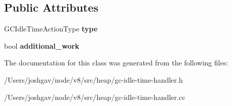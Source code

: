 \subsection*{Public Attributes}
\begin{DoxyCompactItemize}
\item 
G\+C\+Idle\+Time\+Action\+Type {\bfseries type}\hypertarget{classv8_1_1internal_1_1_g_c_idle_time_action_a212425aefe31dba1f8e914a21bc2f94f}{}\label{classv8_1_1internal_1_1_g_c_idle_time_action_a212425aefe31dba1f8e914a21bc2f94f}

\item 
bool {\bfseries additional\+\_\+work}\hypertarget{classv8_1_1internal_1_1_g_c_idle_time_action_aad4d2facf246f97d143f85fe0d371571}{}\label{classv8_1_1internal_1_1_g_c_idle_time_action_aad4d2facf246f97d143f85fe0d371571}

\end{DoxyCompactItemize}


The documentation for this class was generated from the following files\+:\begin{DoxyCompactItemize}
\item 
/\+Users/joshgav/node/v8/src/heap/gc-\/idle-\/time-\/handler.\+h\item 
/\+Users/joshgav/node/v8/src/heap/gc-\/idle-\/time-\/handler.\+cc\end{DoxyCompactItemize}
